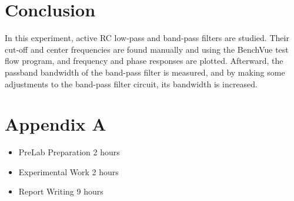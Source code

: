 \documentclass[letterpaper,12pt]{article}
\begin{document}
\section{Conclusion}
In this experiment, active RC low-pass and band-pass filters are studied. Their cut-off and center frequencies are found manually and using the BenchVue test flow program, and frequency and phase responses are plotted. Afterward, the passband bandwidth of the band-pass filter is measured, and by making some adjustments to the band-pass filter circuit, its bandwidth is increased.

\section*{Appendix A}
\begin{itemize}
    \item PreLab Preparation 2 hours
    \item Experimental Work 2  hours
    \item Report Writing 9 hours
\end{itemize}
\end{document}
